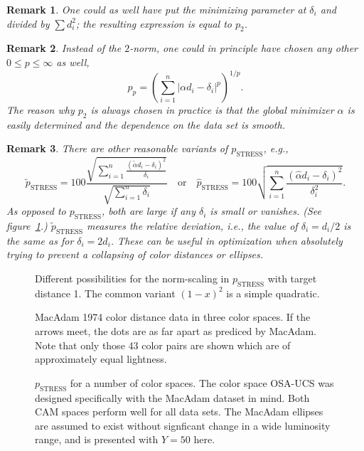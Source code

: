 \documentclass{scrartcl}
\newtheorem*{remark}{Remark}
\theoremstyle{named}
\begin{document}
\begin{remark}
One could as well have put the minimizing parameter at $\delta_i$ and divided by $\sum
  d_i^2$; the resulting expression is equal to $p_2$.
\end{remark}

\begin{remark}
Instead of the $2$-norm, one could in principle have chosen any other $0\le p\le\infty$
  as well,
\[
p_p = \left(\sum_{i=1}^n |\alpha d_i - \delta_i|^p\right)^{1/p}.
\]
The reason why $p_2$ is always chosen in practice is that the global minimizer $\alpha$
  is easily determined and the dependence on the data set is smooth.
\end{remark}

\begin{remark}
  There are other reasonable variants of $p_\text{STRESS}$, e.g.,
  \[
    \tilde{p}_\text{STRESS} = 100 \frac{\sqrt{\sum_{i=1}^n \frac{(\tilde{\alpha} d_i -
    \delta_i)^2}{\delta_i}}}{\sqrt{\sum_{i=1}^n \delta_i}}
    \quad\text{or}\quad
    \hat{p}_\text{STRESS} = 100 \sqrt{\sum_{i=1}^n \frac{(\hat{\alpha} d_i -
    \delta_i)^2}{\delta_i^2}}.
  \]
  As opposed to $p_\text{STRESS}$, both are large if any $\delta_i$ is small or
  vanishes. (See figure~\ref{fig:norm-scaling}.)
  $\tilde{p}_\text{STRESS}$
  measures the
  relative deviation, i.e., the value of $\delta_i=d_i/2$ is the same as for $\delta_i =
  2 d_i$.
  These can be useful in optimization when absolutely trying to prevent a collapsing of
  color distances or ellipses.
\end{remark}

\begin{figure}
  \label{fig:norm-scaling}
  \centering
  
  \caption{Different possibilities for the norm-scaling in $p_\text{STRESS}$ with target
  distance 1. The common variant $(1-x)^2$ is a simple quadratic.}
\end{figure}

\begin{figure}
  \centering
  
  \hfill
  
  \hfill
  
  \caption{MacAdam 1974 color distance data in three color spaces. If the arrows meet,
  the dots are as far apart as prediced by MacAdam. Note that only those 43 color pairs
  are shown which are of approximately equal lightness.}
\end{figure}

\begin{figure}
\centering

\caption{$p_\text{STRESS}$ for a number of color spaces. The color space OSA-UCS was
designed specifically with the MacAdam \cite{macadam1974} dataset in mind. Both CAM
spaces perform well for all data sets. The MacAdam ellipses are assumed to exist without
  signficant change in a wide luminosity range, and is presented with $Y=50$ here.}
\end{figure}
\end{document}
